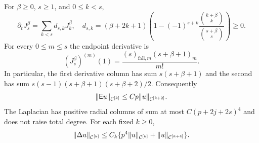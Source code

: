 \begin{lemma}\label{inf:derivative-moments}
For $\beta\ge0$, $s\ge1$, and $0\le k<s$,
\begin{equation}\label{inf:derivative-column}
 \partial_tJ_s^\beta=\sum_{k<s}d_{s,k}J_k^\beta,
 \quad d_{s,k}=(\beta+2k+1)
 \left(1-(-1)^{s+k}\frac{\binom{k+\beta}{k}}{\binom{s+\beta}{s}}\right)
 \ge0.
\end{equation}
For every $0\le m\le s$ the endpoint derivative is
\begin{equation}\label{inf:Jacobi-endpoint-derivatives}
 (J_s^\beta)^{(m)}(1)
 =\frac{(s)_{\mathrm{fall},m}(s+\beta+1)_m}{m!}.
\end{equation}
In particular, the first derivative column has sum
$s(s+\beta+1)$ and the second has sum
$s(s-1)(s+\beta+1)(s+\beta+2)/2$.
Consequently
\begin{equation}\label{inf:Euler-moment}
 \lVert \mathsf E u\rVert_{\mathcal C^{[k]}}\le Cp\lVert u\rVert_{\mathcal C^{[k+2]}}.
\end{equation}
The Laplacian has positive radial columns of sum at most
$C(p+2j+2s)^4$ and does not raise total degree. For each fixed $k\ge0$,
\begin{equation}\label{inf:Delta-moment}
 \lVert \Delta u\rVert_{\mathcal C^{[k]}}
 \le C_k\{p^4\lVert u\rVert_{\mathcal C^{[k]}}+\lVert u\rVert_{\mathcal C^{[k+4]}}\}.
\end{equation}
\end{lemma}
